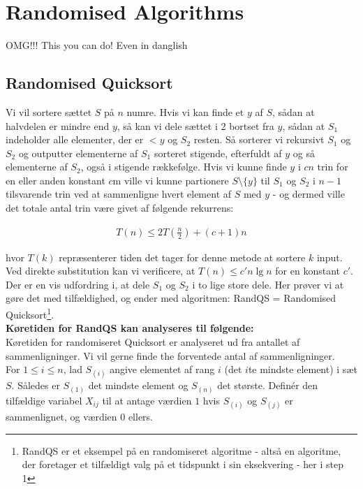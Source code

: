 \section{Randomised Algorithms}
OMG!!! This you can do! Even in danglish

\subsection{Randomised Quicksort}
Vi vil sortere sættet $S$ på $n$ numre. Hvis vi kan finde et $y$ af $S$, sådan at halvdelen er mindre end $y$, så kan vi dele sættet i 2 bortset fra $y$, sådan at $S_1$ indeholder alle elementer, der er $< y$ og $S_2$ resten. Så sorterer vi rekursivt $S_1$ og $S_2$ og outputter elementerne af $S_1$ sorteret stigende, efterfuldt af $y$ og så elementerne af $S_2$, også i stigende rækkefølge. Hvis vi kunne finde $y$ i $cn$ trin for en eller anden konstant $c$m ville vi kunne partionere $S \setminus \{y\}$ til $S_1$ og $S_2$ i $n - 1$ tilsvarende trin ved at sammenligne hvert element af $S$ med $y$ - og dermed ville det totale antal trin være givet af følgende rekurrens: 

\begin{align}
	T(n) \leq 2T(\frac{n}{2}) + (c + 1)n
\end{align}

hvor $T(k)$ repræsenterer tiden det tager for denne metode at sortere $k$ input. Ved direkte substitution kan vi verificere, at $T(n) \leq c'n \lg n$ for en konstant $c'$. \\

Der er en vis udfordring i, at dele $S_1$ og $S_2$ i to lige store dele. Her prøver vi at gøre det med tilfældighed, og ender med algoritmen: RandQS = Randomised Quicksort\footnote{RandQS er et eksempel på en randomiseret algoritme - altså en algoritme, der foretager et tilfældigt valg på et tidspunkt i sin eksekvering - her i step 1}. \\

\textbf{Køretiden for RandQS kan analyseres til følgende:} \\
Køretiden for randomiseret Quicksort er analyseret ud fra antallet af sammenligninger. Vi vil gerne finde the forventede antal af sammenligninger. \\

For $1 \leq i \leq n$, lad $S_{(i)}$ angive elementet af rang $i$ (det $i$te mindste element) i sæt $S$. Således er $S_{(1)}$ det mindste element og $S_{(n)}$ det største. Definér den tilfældige variabel $X_{ij}$ til at antage værdien $1$ hvis $S_{(i)}$ og $S_{(j)}$ er sammenlignet, og værdien $0$ ellers.\\

